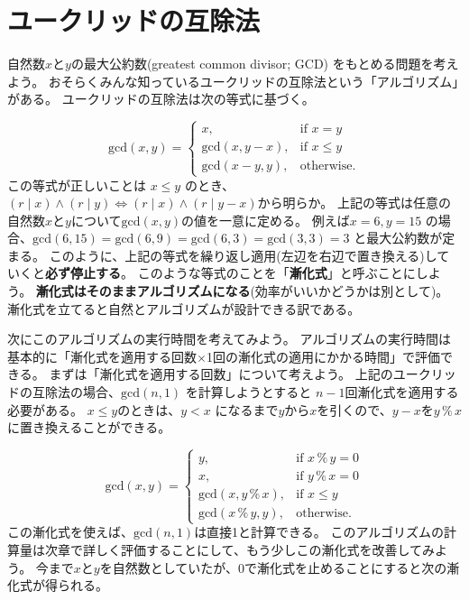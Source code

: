 \documentclass[a4paper,twoside,onecolumn,openany,article,10pt]{memoir}
\theoremstyle{remark}
\begin{document}
\section{ユークリッドの互除法}
自然数$x$と$y$の最大公約数(greatest common divisor; GCD) をもとめる問題を考えよう。
おそらくみんな知っているユークリッドの互除法という「アルゴリズム」がある。
ユークリッドの互除法は次の等式に基づく。

\begin{equation}
\mathrm{gcd}(x, y) =
\begin{cases}
x,& \text{if } x = y\\
\mathrm{gcd}(x, y-x),& \text{if } x \le y\\
\mathrm{gcd}(x-y, y),& \text{otherwise.}
\end{cases}
\label{eq:gcd1}
\end{equation}
この等式が正しいことは $x\le y$ のとき、$(r\mid x) \land (r\mid y) \iff (r\mid x) \land (r\mid y-x)$から明らか。
上記の等式は任意の自然数$x$と$y$について$\mathrm{gcd}(x, y)$の値を一意に定める。
例えば$x=6, y=15$ の場合、$\mathrm{gcd}(6, 15) = \mathrm{gcd}(6, 9) = \mathrm{gcd}(6, 3) = \mathrm{gcd}(3, 3) = 3$ と最大公約数が定まる。
このように、上記の等式を繰り返し適用(左辺を右辺で置き換える)していくと\textbf{必ず停止する}。
このような等式のことを「\textbf{漸化式}」と呼ぶことにしよう。
\textbf{漸化式はそのままアルゴリズムになる}(効率がいいかどうかは別として)。
漸化式を立てると自然とアルゴリズムが設計できる訳である。

次にこのアルゴリズムの実行時間を考えてみよう。
アルゴリズムの実行時間は基本的に「漸化式を適用する回数$\times$1回の漸化式の適用にかかる時間」で評価できる。
まずは「漸化式を適用する回数」について考えよう。
上記のユークリッドの互除法の場合、$\mathrm{gcd}(n, 1)$ を計算しようとすると $n-1$回漸化式を適用する必要がある。
$x\le y$のときは、$y < x$ になるまで$y$から$x$を引くので、$y-x$を$y\,\%\,x$に置き換えることができる。

\begin{equation}
\mathrm{gcd}(x, y) =
\begin{cases}
y,& \text{if } x \,\%\, y = 0\\
x,& \text{if } y \,\%\, x = 0\\
\mathrm{gcd}(x, y\, \%\, x),& \text{if } x\le y\\
\mathrm{gcd}(x\, \%\, y, y),& \text{otherwise.}
\end{cases}
\label{eq:gcd2}
\end{equation}
この漸化式を使えば、$\mathrm{gcd}(n,1)$は直接1と計算できる。
このアルゴリズムの計算量は次章で詳しく評価することにして、もう少しこの漸化式を改善してみよう。
今まで$x$と$y$を自然数としていたが、0で漸化式を止めることにすると次の漸化式が得られる。
\end{document}
